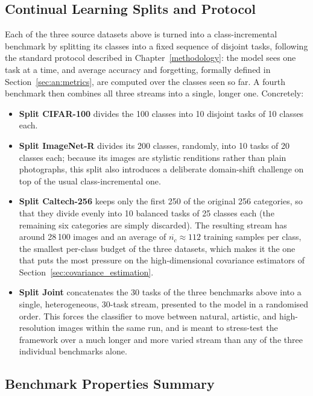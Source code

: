 \subsection{Continual Learning Splits and Protocol}
\label{sec:an:cl_splits}

Each of the three source datasets above is turned into a class-incremental benchmark by splitting its classes into a fixed sequence of disjoint tasks, following the standard protocol described in Chapter~\ref{methodology}: the model sees one task at a time, and average accuracy and forgetting, formally defined in Section~\ref{sec:an:metrics}, are computed over the classes seen so far. A fourth benchmark then combines all three streams into a single, longer one. Concretely:

\begin{itemize}
	\item \textbf{Split CIFAR-100} divides the 100 classes into 10 disjoint tasks of 10 classes each.

	\item \textbf{Split ImageNet-R} divides its 200 classes, randomly, into 10 tasks of 20 classes each; because its images are stylistic renditions rather than plain photographs, this split also introduces a deliberate domain-shift challenge on top of the usual class-incremental one.

	\item \textbf{Split Caltech-256} keeps only the first 250 of the original 256 categories, so that they divide evenly into 10 balanced tasks of 25 classes each (the remaining six categories are simply discarded). The resulting stream has around 28\,100 images and an average of $\overline{n_c}\!\approx\!112$ training samples per class, the smallest per-class budget of the three datasets, which makes it the one that puts the most pressure on the high-dimensional covariance estimators of Section~\ref{sec:covariance_estimation}.

	\item \textbf{Split Joint} concatenates the 30 tasks of the three benchmarks above into a single, heterogeneous, 30-task stream, presented to the model in a randomised order. This forces the classifier to move between natural, artistic, and high-resolution images within the same run, and is meant to stress-test the framework over a much longer and more varied stream than any of the three individual benchmarks alone.
\end{itemize}

\subsection{Benchmark Properties Summary}
\label{sec:an:benchmark_summary}

